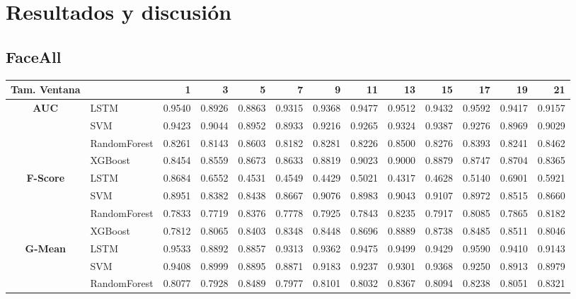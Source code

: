 \chapter{Resultados y discusión}
\section{FaceAll}
\begin{table}[h]
	\begin{adjustbox}{max width=15cm}
		\centering
		\begin{tabular}{|c|l|r|r|r|r|r|r|r|r|r|r|r|}
			\hline
			\textbf{Tam. Ventana}
			&         &      1  &      3  &      5  &      7  &      9  &      11 &      13 &      15 &      17 &      19 &      21 \\
			\hline
			\textbf{AUC} & LSTM &  0.9540 &  0.8926 &  0.8863 &  0.9315 &  0.9368 &  0.9477 &  0.9512 &  0.9432 &  0.9592 &  0.9417 &  0.9157 \\
			& SVM &  0.9423 &  0.9044 &  0.8952 &  0.8933 &  0.9216 &  0.9265 &  0.9324 &  0.9387 &  0.9276 &  0.8969 &  0.9029 \\
			& RandomForest &  0.8261 &  0.8143 &  0.8603 &  0.8182 &  0.8281 &  0.8226 &  0.8500 &  0.8276 &  0.8393 &  0.8241 &  0.8462 \\
			& XGBoost &  0.8454 &  0.8559 &  0.8673 &  0.8633 &  0.8819 &  0.9023 &  0.9000 &  0.8879 &  0.8747 &  0.8704 &  0.8365 \\
			\hline
			\textbf{F-Score} & LSTM &  0.8684 &  0.6552 &  0.4531 &  0.4549 &  0.4429 &  0.5021 &  0.4317 &  0.4628 &  0.5140 &  0.6901 &  0.5921 \\
			& SVM &  0.8951 &  0.8382 &  0.8438 &  0.8667 &  0.9076 &  0.8983 &  0.9043 &  0.9107 &  0.8972 &  0.8515 &  0.8660 \\
			& RandomForest &  0.7833 &  0.7719 &  0.8376 &  0.7778 &  0.7925 &  0.7843 &  0.8235 &  0.7917 &  0.8085 &  0.7865 &  0.8182 \\
			& XGBoost &  0.7812 &  0.8065 &  0.8403 &  0.8348 &  0.8448 &  0.8696 &  0.8889 &  0.8738 &  0.8485 &  0.8511 &  0.8046 \\
			\hline
			\textbf{G-Mean} & LSTM &  0.9533 &  0.8892 &  0.8857 &  0.9313 &  0.9362 &  0.9475 &  0.9499 &  0.9429 &  0.9590 &  0.9410 &  0.9143 \\
			& SVM &  0.9408 &  0.8999 &  0.8895 &  0.8871 &  0.9183 &  0.9237 &  0.9301 &  0.9368 &  0.9250 &  0.8913 &  0.8979 \\
			& RandomForest &  0.8077 &  0.7928 &  0.8489 &  0.7977 &  0.8101 &  0.8032 &  0.8367 &  0.8094 &  0.8238 &  0.8051 &  0.8321 \\

\end{tabular}
\end{adjustbox}
\end{table}
